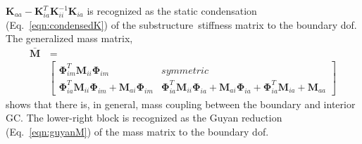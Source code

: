 \documentclass[10pt,openany,twoside]{book}
\numberwithin{equation}{section}   %
\newcommand{\Matrix}[1]{\boldsymbol{#1}}
\newcommand{\Gc}{GC}
\newcommand{\Eqn}[1]{Eq.\ \ref{#1}}
\newcommand{\Ss}{substructure}
\begin{document}
$\Matrix{K}_{aa} - \Matrix{K}_{ia}^T \Matrix{K}_{ii}^{-1} \Matrix{K}_{ia}$
is recognized as the static condensation (\Eqn{eqn:condensedK}) of
the \Ss\ stiffness matrix to the boundary dof. The generalized
mass matrix,
\begin{equation}
\begin{split}
\Matrix{\bar{M}} & \, = \\
 &  \left[
\begin{array}{cc}
   \Matrix{\Phi}_{im}^T \Matrix{M}_{ii} \Matrix{\Phi}_{im} & symmetric \\
   \Matrix{\Phi}_{ia}^T \Matrix{M}_{ii} \Matrix{\Phi}_{im} + \Matrix{M}_{ai} \Matrix{\Phi}_{im} &
                        \Matrix{\Phi}_{ia}^T \Matrix{M}_{ii} \Matrix{\Phi}_{ia} +
                        \Matrix{M}_{ai} \Matrix{\Phi}_{ia} + \Matrix{\Phi}_{ia}^T \Matrix{M}_{ia}
                                + \Matrix{M}_{aa}
\end{array}
\right]
\end{split}		\nonumber
\end{equation}
shows that there is, in general, mass coupling between the
boundary and interior \Gc.
The lower-right block is recognized as the Guyan reduction
(\Eqn{eqn:guyanM})
of the mass matrix to the boundary dof.
\end{document}
